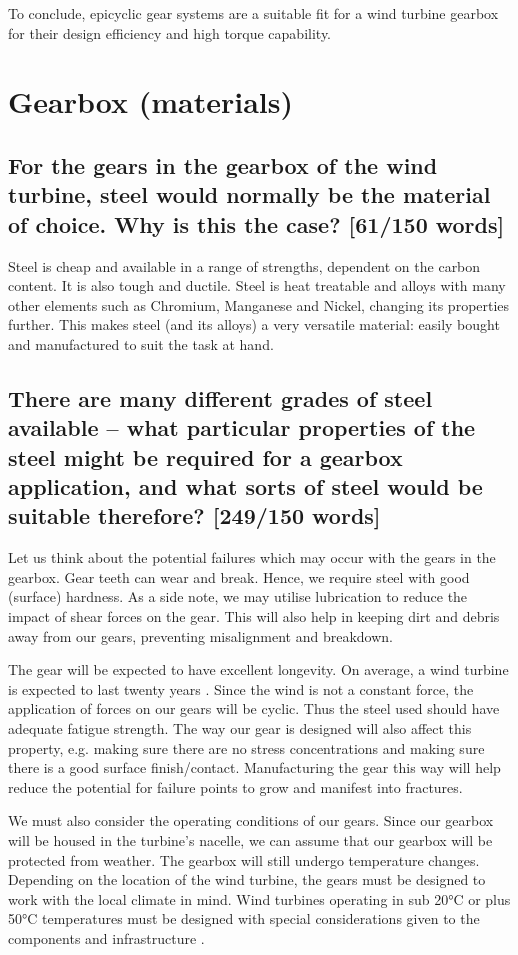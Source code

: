 \documentclass[12pt]{article}
\numberwithin{equation}{section}
\begin{document}
\begin{flushleft}
To conclude, epicyclic gear systems are a suitable fit for a wind turbine gearbox for their design efficiency and high torque capability.
\section{Gearbox (materials)}
\subsection[Why is steel used?]{For the gears in the gearbox of the wind turbine, steel would normally be the material of choice. Why is this the case? [61/150 words]}
Steel is cheap and available in a range of strengths, dependent on the carbon content. It is also tough and ductile. Steel is heat treatable and alloys with many other elements such as Chromium, Manganese and Nickel, changing its properties further. This makes steel (and its alloys) a very versatile material: easily bought and manufactured to suit the task at hand.
\subsection[What steel is suitable?]{There are many different grades of steel available – what particular properties of the steel might be required for a gearbox application, and what sorts of steel would be suitable therefore? [249/150 words]}
Let us think about the potential failures which may occur with the gears in the gearbox. Gear teeth can wear and break. Hence, we require steel with good (surface) hardness. As a side note, we may utilise lubrication to reduce the impact of shear forces on the gear. This will also help in keeping dirt and debris away from our gears, preventing misalignment and breakdown. 

The gear will be expected to have excellent longevity. On average, a wind turbine is expected to last twenty years \citep{windTurbineLifetime}. Since the wind is not a constant force, the application of forces on our gears will be cyclic. Thus the steel used should have adequate fatigue strength. The way our gear is designed will also affect this property, e.g. making sure there are no stress concentrations and making sure there is a good surface finish/contact. Manufacturing the gear this way will help reduce the potential for failure points to grow and manifest into fractures. 

We must also consider the operating conditions of our gears. Since our gearbox will be housed in the turbine's nacelle, we can assume that our gearbox will be protected from weather. The gearbox will still undergo temperature changes. Depending on the location of the wind turbine, the gears must be designed to work with the local climate in mind. Wind turbines operating in sub 20\si{\celsius} or plus 50\si{\celsius} temperatures must be designed with special considerations given to the components and infrastructure \citep{windTurbineOperatingConditions}. 


\end{flushleft}
\end{document}

